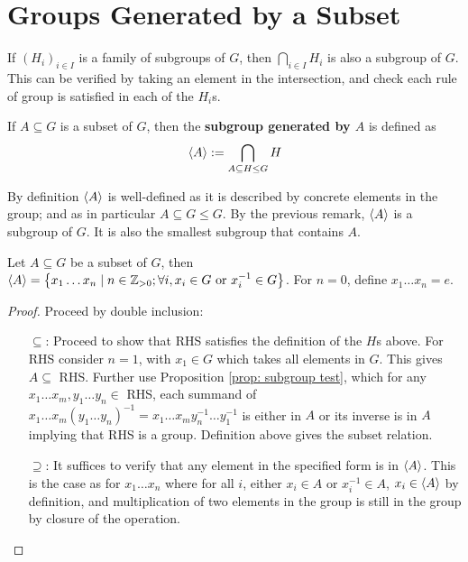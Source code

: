 \documentclass{article}
\begin{document}
\section{Groups Generated by a Subset}

\begin{remark}
    If $(H_i)_{i \in I}$ is a family of subgroups of $G$, then $\bigcap_{i \in I} H_i$ is also a subgroup of $G$. This can be verified by taking an element in the intersection, and check each rule of group is satisfied in each of the $H_i$s.
\end{remark}

\begin{definition}
    If $A \subseteq G$ is a subset of $G$, then the \textbf{subgroup generated by $A$} is defined as
    \[
        \left\langle A \right\rangle := \bigcap_{A \subseteq H \leq G} H
    \]
\end{definition}

\begin{remark}
    By definition $\left\langle A \right\rangle$ is well-defined as it is described by concrete elements in the group; and as in particular $A \subseteq G \leq G$. By the previous remark, $\left\langle A \right\rangle$ is a subgroup of $G$. It is also the smallest subgroup that contains $A$.
\end{remark}

\begin{proposition}\label{prop: explicit presentation of generated subgroup}
    Let $A \subseteq G$ be a subset of $G$, then $\left\langle A \right\rangle = \left\{ x_1\dots x_n \mid n \in \mathbb{Z}_{>0}; \forall i, x_i \in G \text{ or } x_i^{-1} \in G \right\}$. For $n = 0$, define $x_1 \dots x_n = e$. 
\end{proposition}

\begin{proof}
    Proceed by double inclusion:
    \begin{enumerate}
        \item[$\subseteq$:] Proceed to show that RHS satisfies the definition of the $H$s above. For RHS consider $n = 1$, with $x_1 \in G$ which takes all elements in $G$. This gives $A \subseteq$ RHS. Further use Proposition \ref{prop: subgroup test}, which for any $x_1\dots x_m, y_1\dots y_n \in$ RHS, each summand of $x_1 \dots x_m (y_1 \dots y_n)^{-1} = x_1 \dots x_m y_n^{-1} \dots y_1^{-1}$ is either in $A$ or its inverse is in $A$ implying that RHS is a group. Definition above gives the subset relation.
        \item[$\supseteq$:] It suffices to verify that any element in the specified form is in $\left\langle A \right\rangle$. This is the case as for $x_1\dots x_n$ where for all $i$, either $x_i \in A$ or $x_i^{-1} \in A$, $x_i \in \left\langle A \right\rangle$ by definition, and multiplication of two elements in the group is still in the group by closure of the operation.  
    \end{enumerate}
\end{proof}
\end{document}
